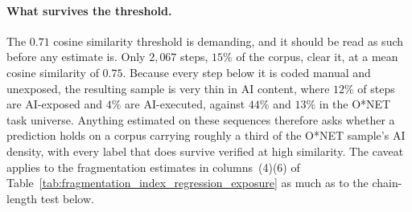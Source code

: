 \paragraph{What survives the threshold.}
The $0.71$ cosine similarity threshold is demanding, and it should be read as such before any estimate is.
Only $2{,}067$ steps, $15\%$ of the corpus, clear it, at a mean cosine similarity of $0.75$.
Because every step below it is coded manual and unexposed, the resulting sample is very thin in AI content, where
$12\%$ of steps are AI-exposed and $4\%$ are AI-executed, against $44\%$ and $13\%$ in the O*NET task
universe.
Anything estimated on these sequences therefore asks whether a prediction holds on a corpus carrying roughly a
third of the O*NET sample's AI density, with every label that does survive verified at high similarity.
The caveat applies to the fragmentation estimates in columns~(4)\textendash(6) of Table~\ref{tab:fragmentation_index_regression_exposure} as much as to the chain-length test below.

